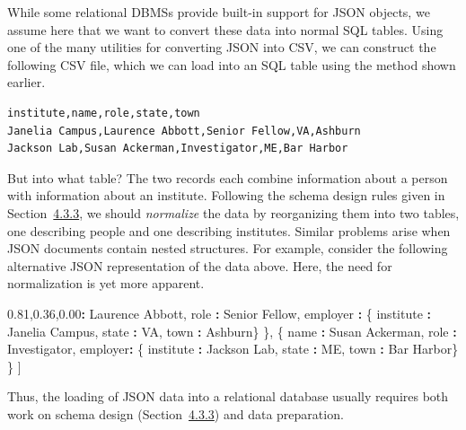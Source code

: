 \documentclass[]{krantz}
\newenvironment{Shaded}{\begin{snugshade}}{\end{snugshade}}
\newcommand{\StringTok}[1]{\textcolor[rgb]{0.31,0.60,0.02}{#1}}
\newcommand{\OperatorTok}[1]{\textcolor[rgb]{0.81,0.36,0.00}{\textbf{#1}}}
\newcommand{\NormalTok}[1]{#1}
\begin{document}
While some relational DBMSs provide built-in support for JSON objects,
we assume here that we want to convert these data into normal SQL
tables. Using one of the many utilities for converting JSON into CSV, we
can construct the following CSV file, which we can load into an SQL
table using the method shown earlier.

\begin{verbatim}
institute,name,role,state,town
Janelia Campus,Laurence Abbott,Senior Fellow,VA,Ashburn
Jackson Lab,Susan Ackerman,Investigator,ME,Bar Harbor
\end{verbatim}

But into what table? The two records each combine information about a
person with information about an institute. Following the schema design
rules given in Section~\protect\hyperlink{sec:db:schema}{4.3.3}, we
should \emph{normalize} the data by reorganizing them into two tables,
one describing people and one describing institutes. Similar problems
arise when JSON documents contain nested structures. For example,
consider the following alternative JSON representation of the data
above. Here, the need for normalization is yet more apparent.

\begin{Shaded}
\begin{Highlighting}[]
\NormalTok{[}
\NormalTok{  \{}
\NormalTok{    name }\OperatorTok{:}\StringTok{ }\NormalTok{Laurence Abbott,}
\NormalTok{    role }\OperatorTok{:}\StringTok{ }\NormalTok{Senior Fellow,}
\NormalTok{    employer }\OperatorTok{:}\StringTok{ }\NormalTok{\{ institute }\OperatorTok{:}\StringTok{ }\NormalTok{Janelia Campus,}
\NormalTok{                 state }\OperatorTok{:}\StringTok{ }\NormalTok{VA,}
\NormalTok{                 town }\OperatorTok{:}\StringTok{ }\NormalTok{Ashburn\}}
\NormalTok{  \},}
\NormalTok{  \{}
\NormalTok{    name }\OperatorTok{:}\StringTok{ }\NormalTok{Susan Ackerman,}
\NormalTok{    role }\OperatorTok{:}\StringTok{ }\NormalTok{Investigator,}
\NormalTok{    employer}\OperatorTok{:}\StringTok{ }\NormalTok{\{ institute }\OperatorTok{:}\StringTok{ }\NormalTok{Jackson Lab,}
\NormalTok{                state }\OperatorTok{:}\StringTok{ }\NormalTok{ME,}
\NormalTok{                town }\OperatorTok{:}\StringTok{ }\NormalTok{Bar Harbor\}}
\NormalTok{  \}}
\NormalTok{]}
\end{Highlighting}
\end{Shaded}

Thus, the loading of JSON data into a relational database usually
requires both work on schema design
(Section~\protect\hyperlink{sec:db:schema}{4.3.3}) and data preparation.
\end{document}
